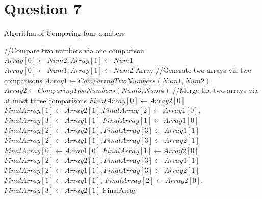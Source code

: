 \documentclass[11pt]{article}
\begin{document}
\section{Question 7}
\label{q7}
\begin{algorithm}
\caption{Algorithm of Comparing four numbers}
\begin{algorithmic}[1]
\State //Compare two numbers via one comparison
    \State  $Array[0] \gets Num2, Array[1] \gets Num1$
\Else
    \State  $Array[0] \gets Num1, Array[1] \gets Num2$
\EndIf
\State \Return Array
\EndProcedure
{}
\State //Generate two arrays via two comparisons
\State $Array1 \gets ComparingTwoNumbers(Num1, Num2)$
\State $Array2 \gets ComparingTwoNumbers(Num3, Num4)$
\State //Merge the two arrays via at most three comparisons
    \State $FinalArray[0] \gets Array2[0]$
        \State $FinalArray[1] \gets Array2[1]$,$FinalArray[2] \gets Array1[0]$,$FinalArray[3] \gets Array1[1]$
    \Else
        \State $FinalArray[1] \gets Array1[0]$
            \State $FinalArray[2] \gets Array2[1], FinalArray[3] \gets Array1[1]$
        \Else
            \State $FinalArray[2] \gets Array1[1], FinalArray[3] \gets Array2[1]$            
        \EndIf
    \EndIf
\Else
    \State $FinalArray[0] \gets Array1[0]$
        \State $FinalArray[1] \gets Array2[0]$
            \State $FinalArray[2] \gets Array2[1], FinalArray[3] \gets Array1[1]$
        \Else
            \State $FinalArray[2] \gets Array1[1], FinalArray[3] \gets Array2[1]$            
        \EndIf
    \Else
        \State $FinalArray[1] \gets Array1[1]$, $FinalArray[2] \gets Array2[0]$, $FinalArray[3] \gets Array2[1]$
    \EndIf
\EndIf
\State \Return FinalArray
\EndProcedure
\end{algorithmic}
\end{algorithm}

\newpage
\end{document}
